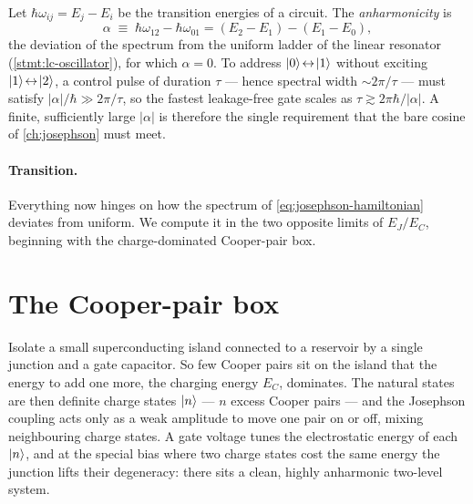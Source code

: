\begin{statement}
\label{stmt:anharmonicity}
Let $\hbar\omega_{ij}=E_j-E_i$ be the transition energies of a circuit.
The \emph{anharmonicity} is
\begin{equation}
\label{eq:anharmonicity}
\alpha \;\equiv\; \hbar\omega_{12}-\hbar\omega_{01}
= (E_2-E_1)-(E_1-E_0),
\end{equation}
the deviation of the spectrum from the uniform ladder of the linear
resonator (\cref{stmt:lc-oscillator}), for which $\alpha=0$. To address
$\ket0\!\leftrightarrow\!\ket1$ without exciting
$\ket1\!\leftrightarrow\!\ket2$, a control pulse of duration $\tau$ ---
hence spectral width $\sim2\pi/\tau$ --- must satisfy
$|\alpha|/\hbar\gg2\pi/\tau$, so the fastest leakage-free gate scales
as $\tau\gtrsim2\pi\hbar/|\alpha|$. A finite, sufficiently large
$|\alpha|$ is therefore the single requirement that the bare cosine of
\cref{ch:josephson} must meet.
\end{statement}

\paragraph{Transition.}
Everything now hinges on how the spectrum of
\cref{eq:josephson-hamiltonian} deviates from uniform. We compute it in
the two opposite limits of $E_J/E_C$, beginning with the
charge-dominated Cooper-pair box.

\section{The Cooper-pair box}
\label{sec:cpb}

\begin{phenomenon}
Isolate a small superconducting island connected to a reservoir by a
single junction and a gate capacitor. So few Cooper pairs sit on the
island that the energy to add one more, the charging energy $E_C$,
dominates. The natural states are then definite charge states
$\ket n$ --- $n$ excess Cooper pairs --- and the Josephson coupling
acts only as a weak amplitude to move one pair on or off, mixing
neighbouring charge states. A gate voltage tunes the electrostatic
energy of each $\ket n$, and at the special bias where two charge
states cost the same energy the junction lifts their degeneracy: there
sits a clean, highly anharmonic two-level system.
\end{phenomenon}

